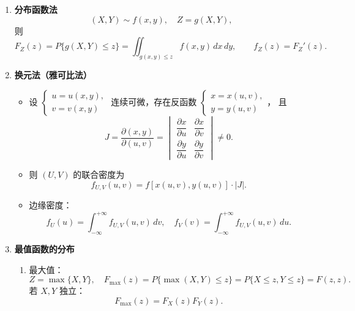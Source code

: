 \begin{enumerate}
      \item \textbf{分布函数法}
            $$
                  (X,Y)\sim f(x,y), \quad Z=g(X,Y),
            $$
            则
            $$
                  F_Z(z)=P\{g(X,Y)\le z\}=\iint_{g(x,y)\le z} f(x,y)\,dx\,dy,
                  \qquad f_Z(z)=F_Z'(z).
            $$

      \item \textbf{换元法（雅可比法）}
            \begin{itemize}
                  \item 设 $\begin{cases} u=u(x,y), \\ v=v(x,y) \end{cases}$ 连续可微，存在反函数 $\begin{cases} x=x(u,v), \\ y=y(u,v) \end{cases}$，
                        且
                        $$
                              J=\frac{\partial(x,y)}{\partial(u,v)}
                              =\begin{vmatrix}
                                    \dfrac{\partial x}{\partial u} & \dfrac{\partial x}{\partial v} \\[4pt]
                                    \dfrac{\partial y}{\partial u} & \dfrac{\partial y}{\partial v}
                              \end{vmatrix}\neq 0.
                        $$
                  \item 则 $(U,V)$ 的联合密度为
                        $$
                              f_{U,V}(u,v)=f[x(u,v),y(u,v)]\cdot|J|.
                        $$
                  \item 边缘密度：
                        $$
                              f_U(u)=\int_{-\infty}^{+\infty}f_{U,V}(u,v)\,dv, \quad
                              f_V(v)=\int_{-\infty}^{+\infty}f_{U,V}(u,v)\,du.
                        $$
            \end{itemize}

      \item \textbf{最值函数的分布}
            \begin{enumerate}
                  \item 最大值：
                        $$
                              Z=\max\{X,Y\},\quad F_{\max}(z)=P\{\max(X,Y)\le z\}=P\{X\le z, Y\le z\}=F(z,z).
                        $$
                        若 $X,Y$ 独立：
                        $$
                              F_{\max}(z)=F_X(z)F_Y(z).
                        $$


\end{enumerate}
\end{enumerate}
